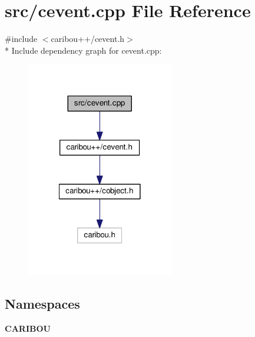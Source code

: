 \section{src/cevent.cpp File Reference}
\label{cevent_8cpp}
{\ttfamily \#include $<$caribou++/cevent.\-h$>$}\\*
Include dependency graph for cevent.\-cpp\-:\nopagebreak
\begin{figure}[H]
\begin{center}
\leavevmode
\includegraphics[width=182pt]{cevent_8cpp__incl}
\end{center}
\end{figure}
\subsection*{Namespaces}
\begin{DoxyCompactItemize}
\item 
{\bf C\-A\-R\-I\-B\-O\-U}
\end{DoxyCompactItemize}
